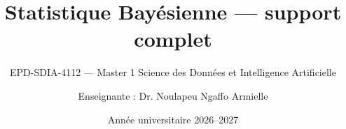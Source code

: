 
\title[Cours complet]{Statistique Bayésienne --- support complet}
\subtitle{EPD-SDIA-4112 --- Master 1 Science des Données et Intelligence Artificielle}
\author{Enseignante : Dr. Noulapeu Ngaffo Armielle}
\date{Année universitaire 2026--2027}




















